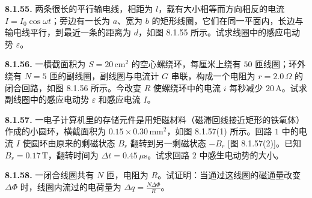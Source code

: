 \begin{center}
\end{center}

\vfill
\newpage

\textbf{8.1.55.} 两条很长的平行输电线，相距为 $l$，载有大小相等而方向相反的电流 $I = I_0 \cos \omega t$；旁边有一长为 $a$、宽为 $b$ 的矩形线圈，它们在同一平面内，长边与输电线平行，到最近一条的距离为 $d$，如图 8.1.55 所示。试求线圈中的感应电动势 $\varepsilon$。

\begin{center}
\end{center}

\vfill
\newpage

\textbf{8.1.56.} 一横截面积为 $S = 20\,\mathrm{cm}^2$ 的空心螺绕环，每厘米上绕有 $50$ 匝线圈；环外绕有 $N = 5$ 匝的副线圈，副线圈与电流计 $G$ 串联，构成一个电阻为 $r = 2.0\,\Omega$ 的闭合回路，如图 8.1.56 所示。今改变 $R$ 使螺绕环中的电流 $i$ 每秒减少 $20\,\mathrm{A}$。试求副线圈中的感应电动势 $\varepsilon$ 和感应电流 $I$。

\begin{center}
\end{center}

\vfill
\newpage

\textbf{8.1.57.} 一电子计算机里的存储元件是用矩磁材料（磁滞回线接近矩形的铁氧体）作成的小圆环，横截面积为 $0.15 \times 0.30\,\mathrm{mm}^2$，如图 8.1.57(1) 所示。回路 $1$ 中的电流 $I$ 使圆环由原来的剩磁状态 $B_r$ 翻转到另一剩磁状态 $-B_r$ [图 8.1.57(2)]。已知 $B_r = 0.17\,\mathrm{T}$，翻转时间为 $\Delta t = 0.45\,\mu\mathrm{s}$。试求回路 $2$ 中感生电动势的大小。

\begin{center}
  \begin{minipage}[b]{0.47\linewidth}
    \centering
  \end{minipage}\hfill
  \begin{minipage}[b]{0.47\linewidth}
    \centering
  \end{minipage}
\end{center}

\vfill
\newpage

\textbf{8.1.58.} 一闭合线圈共有 $N$ 匝，电阻为 $R$。试证明：当通过这线圈的磁通量改变 $\Delta\Phi$ 时，线圈内流过的电荷量为 $\displaystyle \Delta q = \frac{N\Delta\Phi}{R}$。

